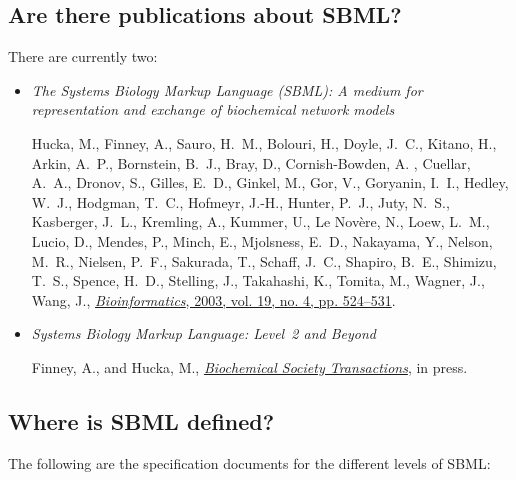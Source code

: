 \documentclass{sbmlfaq}
\begin{document}
\subsection{Are there publications about SBML?}

There are currently two:

\begin{itemize}
  
\item \emph{The Systems Biology Markup Language (SBML): A
    medium for representation and exchange of biochemical network
    models}
    
    Hucka, M., Finney, A., Sauro, H.~M., Bolouri, H., Doyle, J.~C., Kitano,
    H., Arkin, A.~P., Bornstein, B.~J., Bray, D., Cornish-Bowden, A. ,
    Cuellar, A.~A., Dronov, S., Gilles, E.~D., Ginkel, M., Gor, V.,
    Goryanin, I.~I., Hedley, W.~J., Hodgman, T.~C., Hofmeyr, J.-H., Hunter,
    P.~J., Juty, N.~S., Kasberger, J.~L., Kremling, A., Kummer, U., Le
    Nov\`{e}re, N., Loew, L.~M., Lucio, D., Mendes, P., Minch, E.,
    Mjolsness, E.~D., Nakayama, Y., Nelson, M.~R., Nielsen, P.~F.,
    Sakurada, T., Schaff, J.~C., Shapiro, B.~E., Shimizu, T.~S., Spence,
    H.~D., Stelling, J., Takahashi, K., Tomita, M., Wagner, J., Wang, J.,
    \href{http://bioinformatics.oupjournals.org/cgi/reprint/19/4/524?ijkey=BzZTZ.dDZEXp0U&keytype=ref&siteid=bioinfo}{\emph{Bioinformatics},
      2003, vol. 19, no. 4, pp. 524--531}.

\item \emph{Systems Biology Markup Language: Level~2 and Beyond}

    Finney, A., and Hucka, M.,
    \href{http://www.biochemsoctrans.org/}{\emph{Biochemical Society
        Transactions}}, in press.

\end{itemize}



\subsection{Where is SBML defined?}
\label{sec:spec-docs}
The following are the specification documents for the different levels of
SBML:
\end{document}
